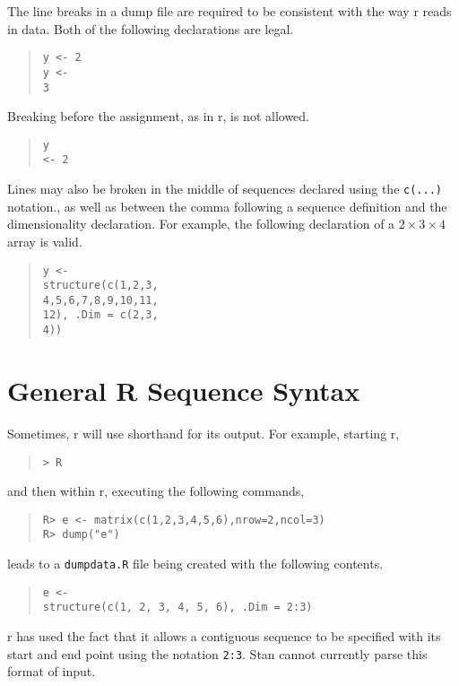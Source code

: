 \documentclass[10pt]{report}
\newcommand{\Stan}{Stan\xspace}
\newcommand{\acronym}[1]{{\sc #1}\xspace}
\newcommand{\R}{\acronym{r}}
\newcommand{\code}[1]{{\tt #1}}
\begin{document}
The line breaks in a dump file are required to be consistent with
the way \R reads in data.  Both of the following declarations are
legal.
%
\begin{quote}
\begin{Verbatim}
y <- 2
y <-
3
\end{Verbatim}
\end{quote}
%
Breaking before the assignment, as in \R, is not allowed.
%
\begin{quote}
\begin{Verbatim}
y
<- 2
\end{Verbatim}
\end{quote}

Lines may also be broken in the middle of sequences declared
using the \code{c(...)} notation., as well as between the comma
following a sequence definition and the dimensionality declaration.
For example, the following declaration of a $2 \times 3 \times 4$
array is valid.
%
\begin{quote}
\begin{Verbatim}
y <-
structure(c(1,2,3,
4,5,6,7,8,9,10,11,
12), .Dim = c(2,3,
4))
\end{Verbatim}
\end{quote}

\section{General R Sequence Syntax}

Sometimes, \R will use shorthand for its output. For example,
starting \R,

\begin{quote}
\begin{Verbatim}[fontshape=sl]
> R
\end{Verbatim}
\end{quote}
%
and then within \R, executing the following commands,

\begin{quote}
\begin{Verbatim}[fontshape=sl]
R> e <- matrix(c(1,2,3,4,5,6),nrow=2,ncol=3)
R> dump("e")
\end{Verbatim}
\end{quote}
%
leads to a \code{dumpdata.R} file being created with
the following contents.
%
\begin{quote}
\begin{Verbatim}
e <-
structure(c(1, 2, 3, 4, 5, 6), .Dim = 2:3)
\end{Verbatim}
\end{quote}
%
\R has used the fact that it allows a contiguous
sequence to be specified with its start and end point
using the notation \code{2:3}.  \Stan cannot currently
parse this format of input.  
\end{document}
